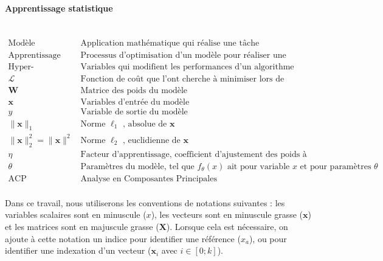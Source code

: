 \paragraph{Apprentissage statistique}\mbox{} \\
$
\begin{array}{ll}
{\text{Modèle}} & {\text{Application mathématique qui réalise une tâche (classification, régression, etc.)}} \\
{\text{Apprentissage}} & {\text{Processus d'optimisation d'un modèle pour réaliser une tâche}} \\
{\text{Hyper-paramètres}} & {\text{Variables qui modifient les performances d'un algorithme d'apprentissage}} \\
{\mathcal{L}} & {\text{Fonction de coût que l'ont cherche à minimiser lors de l'apprentissage d'un modèle}}\\
{\mathbf{W}} & {\text{Matrice des poids du modèle}} \\
{\mathbf{x}} & {\text{Variables d'entrée du modèle}} \\
{y} & {\text{Variable de sortie du modèle}} \\
{\|\mathbf{x}\|_1} & {\text{Norme } \ell_{1} \text{ , absolue de }\mathbf{x}} \\
{\|\mathbf{x}\|_2^2 = \|\mathbf{x}\|^2} & {\text{Norme } \ell_{2} \text{ , euclidienne de }\mathbf{x}} \\
{\eta} & {\text {Facteur d'apprentissage, coefficient d'ajustement des poids à chaque itération}} \\
{\theta} & {\text{Paramètres du modèle, tel que } f_{\theta}(x) \text{ ait pour variable } x \text{ et pour paramètres } \theta} \\
{\text{ACP}} & {\text{Analyse en Composantes Principales}} \\
\end{array}
$

\vspace{5mm}  %
Dans ce travail, nous utiliserons les conventions de notations suivantes : les variables scalaires sont en minuscule ($x$), les vecteurs sont en minuscule grasse ($\mathbf{x}$) et les matrices sont en majuscule grasse ($\mathbf{X}$).
Lorsque cela est nécessaire, on ajoute à cette notation un indice pour identifier une référence ($x_a$), ou pour identifier une indexation d'un vecteur ($\mathbf{x}_i$ avec $i \in [0 ; k]$).
